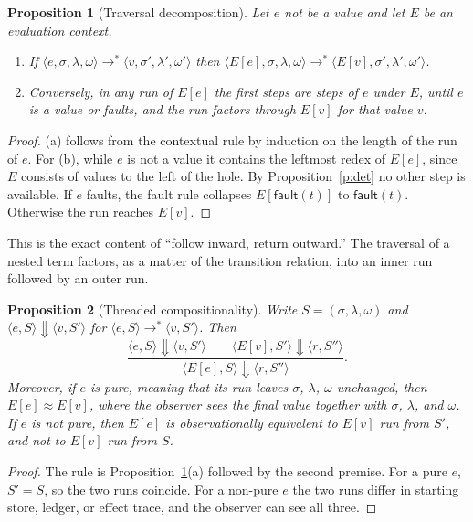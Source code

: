 \documentclass[11pt]{article}
\newtheorem{proposition}{Proposition}
\newcommand{\cfg}[1]{\langle #1\rangle}
\newcommand{\step}{\longrightarrow}
\newcommand{\faultval}{\mathsf{fault}}
\begin{document}
\begin{proposition}[Traversal decomposition]\label{p:trav}
Let $e$ not be a value and let $E$ be an evaluation context.
\begin{enumerate}[label=(\alph*)]
\item If $\cfg{e,\sigma,\lambda,\omega}\step^{\ast}\cfg{v,\sigma',\lambda',\omega'}$ then $\cfg{E[e],\sigma,\lambda,\omega}\step^{\ast}\cfg{E[v],\sigma',\lambda',\omega'}$.
\item Conversely, in any run of $E[e]$ the first steps are steps of $e$ under $E$, until $e$ is a value or faults, and the run factors through $E[v]$ for that value $v$.
\end{enumerate}
\end{proposition}
\begin{proof}
(a) follows from the contextual rule by induction on the length of the run of $e$. For (b), while $e$ is not a value it contains the leftmost redex of $E[e]$, since $E$ consists of values to the left of the hole. By Proposition~\ref{p:det} no other step is available. If $e$ faults, the fault rule collapses $E[\faultval(t)]$ to $\faultval(t)$. Otherwise the run reaches $E[v]$.
\end{proof}

This is the exact content of ``follow inward, return outward.'' The traversal of a nested term factors, as a matter of the transition relation, into an inner run followed by an outer run.

\begin{proposition}[Threaded compositionality]\label{p:comp}
Write $S=(\sigma,\lambda,\omega)$ and $\langle e,S\rangle\Downarrow\langle v,S'\rangle$ for $\langle e,S\rangle\step^{\ast}\langle v,S'\rangle$. Then
\[
\dfrac{\langle e,S\rangle\Downarrow\langle v,S'\rangle\qquad\langle E[v],S'\rangle\Downarrow\langle r,S''\rangle}
      {\langle E[e],S\rangle\Downarrow\langle r,S''\rangle}.
\]
Moreover, if $e$ is \emph{pure}, meaning that its run leaves $\sigma$, $\lambda$, $\omega$ unchanged, then $E[e]\approx E[v]$, where the observer sees the final value together with $\sigma$, $\lambda$, and $\omega$. If $e$ is not pure, then $E[e]$ is observationally equivalent to $E[v]$ run from $S'$, and not to $E[v]$ run from $S$.
\end{proposition}
\begin{proof}
The rule is Proposition~\ref{p:trav}(a) followed by the second premise. For a pure $e$, $S'=S$, so the two runs coincide. For a non-pure $e$ the two runs differ in starting store, ledger, or effect trace, and the observer can see all three.
\end{proof}
\end{document}
